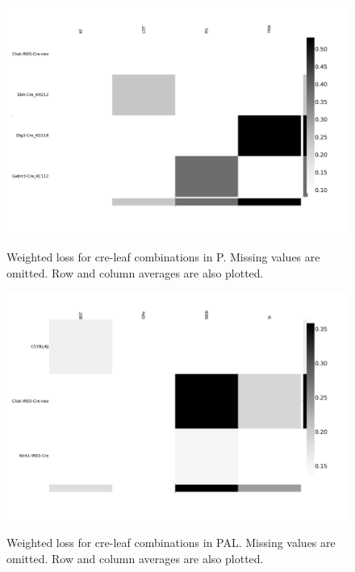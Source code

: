 \begin{figure}[H]
    \centering
    \includegraphics[width = 7in]{figs/lossdetails_771.png} 
    \label{fig:distances}
    \caption{Weighted loss for cre-leaf combinations in P. Missing values are omitted.    Row and column averages are also plotted.}
\end{figure}
\begin{figure}[H]
    \centering
    \includegraphics[width = 7in]{figs/lossdetails_803.png} 
    \label{fig:distances}
    \caption{Weighted loss for cre-leaf combinations in PAL. Missing values are omitted.  Row and column averages are also plotted.}
\end{figure}

